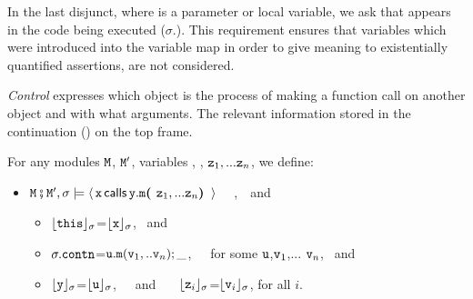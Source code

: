 \noindent 
In the last disjunct, where  is a parameter or local variable,
we  ask that   \mrr[\x]{} appears in the code being executed ($\sigma$.).
This requirement %
ensures that variables which were introduced into the variable map 
in order to give meaning to existentially quantified assertions, are not considered.


\vspace{.2cm} \noindent
\textit{Control} expresses which object is the process of making a function call on another object and
with what arguments. The relevant information
 stored in the continuation () on the top frame.
\begin{definition}[%
Control]  \label{def:valid:assertion:control}
For any modules $\M$, $\M'$,  variables  , \y, $\prg{z}_1,...\prg{z}_n$, we define$:$
\begin{itemize}
   \item
$\M\mkpair \M', \sigma \models  \Calls {\prg{x}}  {\prg{m}} {\prg{y}}  {\z_1,...\z_n}$ \IFF \ \ ,\ \  and 
\begin{itemize}
\item
$\interp{\prg{this}}{\sigma}$=$\interp{\prg{x}}{\sigma}$, \ and
\item
$\sigma.\prg{contn}$=${\uu.\m(\v_1,..\v_n);\_}$,\ \ \ for some  $\uu$,$\v_1$,... $\v_n$, \ and
\item
 $\interp{\prg{y}}{\sigma}$=$\interp{\prg{u}}{\sigma}$,\ \ \ and \ \ \ 
  $\interp{\z_i}{\sigma}$=$\interp{{\prg{v}_i}}{\sigma}$, for all  $i$.
 \end{itemize}
  \end{itemize}
\end{definition}
